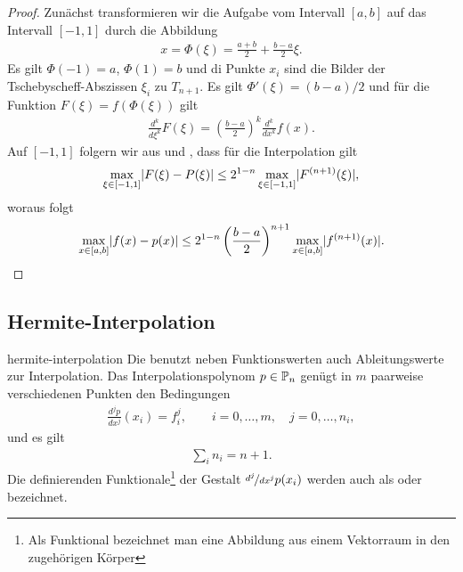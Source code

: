 \begin{proof}
  Zunächst transformieren wir die Aufgabe vom Intervall $[a,b]$ auf
  das Intervall $[-1,1]$ durch die Abbildung
  \begin{gather}
    x = \Phi(\xi) = \frac{a+b}2 + \frac{b-a}2 \xi.
  \end{gather}
  Es gilt $\Phi(-1) = a$, $\Phi(1)=b$ und di Punkte $x_i$ sind die
  Bilder der Tschebyscheff-Abszissen $\xi_i$ zu $T_{n+1}$. Es gilt
  $\Phi'(\xi) = (b-a)/2$ und für die Funktion $F(\xi) = f(\Phi(\xi))$
  gilt
  \begin{gather}
    \frac{d^k}{d\xi^k} F(\xi) = \left(\frac{b-a}2\right)^k
    \frac{d^k}{dx^k} f(x).
  \end{gather}
  Auf $[-1,1]$ folgern wir aus  und
  , dass für die Interpolation gilt
  \begin{gather}
    \max_{\xi\in[-1,1]} \abs{F(\xi) - P(\xi)}
    \le 2^{1-n} \max_{\xi\in[-1,1]}\abs{F^{(n+1)}(\xi)},
  \end{gather}
  woraus folgt
  \begin{gather}
    \max_{x\in[a,b]} \abs{f(x) - p(x)}
    \le 2^{1-n} \left(\frac{b-a}2\right)^{n+1} \max_{x\in[a,b]}\abs{f^{(n+1)}(x)}.
  \end{gather}  
\end{proof}

\subsection{Hermite-Interpolation}

\begin{Definition}{hermite-interpolation}
  Die  benutzt neben Funktionswerten
  auch Ableitungswerte zur Interpolation. Das Interpolationspolynom
  $p\in \P_n$ genügt in $m$ paarweise verschiedenen Punkten den
  Bedingungen
  \begin{gather}
    \frac{d^j p}{dx^j}(x_i) = f_i^{j},
    \qquad i = 0,\dots, m, \quad j=0,\dots,n_i,
  \end{gather}
  und es gilt
  \begin{gather}
    \sum_{i} n_i = n+1.
  \end{gather}
  Die definierenden Funktionale\footnote{Als Funktional bezeichnet man
    eine Abbildung aus einem Vektorraum in den zugehörigen Körper} der Gestalt
  $\nicefrac{d^j}{dx^j} p(x_i)$ werden auch als 
  oder  bezeichnet.
\end{Definition}

